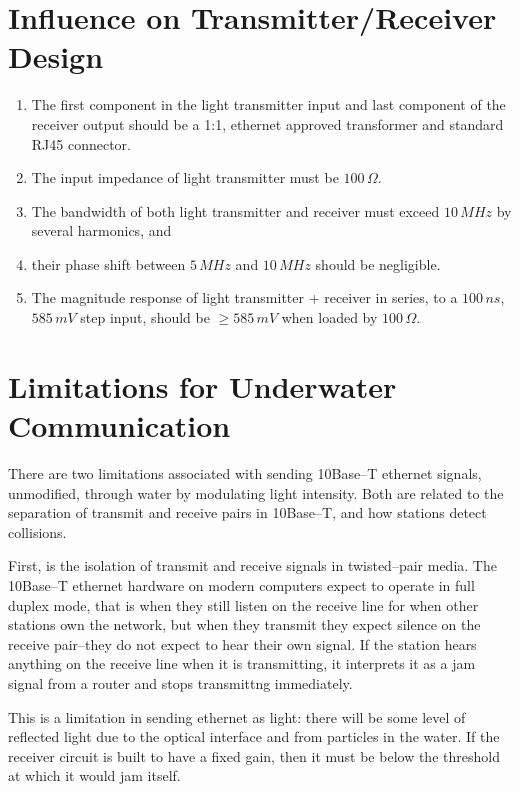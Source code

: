 \documentclass{article}
\begin{document}
\section{Influence on Transmitter/Receiver Design}

\begin{enumerate}
\item The first component in the light transmitter input
and last component of the receiver output should be a 1:1, ethernet approved
transformer and standard RJ45 connector.
\item The input impedance of light transmitter must be $100\,\Omega$.
\item The bandwidth of both light transmitter and receiver must exceed $10\,MHz$
by several harmonics, and
\item their phase shift between $5\,MHz$ and $10\,MHz$ should be negligible.
\item The magnitude response of light transmitter + receiver in series,
to a $100\,ns$, $585\,mV$ step input, should be $\geq585\,mV$ when loaded by $100\,\Omega$.
\end{enumerate}

\section{Limitations for Underwater Communication}

There are two limitations associated with sending 10Base--T ethernet signals,
unmodified, through water by modulating light intensity.
Both are related to the separation of transmit and receive pairs
in 10Base--T, and how stations detect collisions.

First, is the isolation of transmit and receive signals in twisted--pair media.
The 10Base--T ethernet hardware on modern computers expect to operate in full
duplex mode, that is when they still listen on the receive line for when
other stations own the network, but when they transmit they expect silence
on the receive pair--they do not expect to hear their own signal.
If the station hears anything on the receive line when it is transmitting,
it interprets it as a jam signal from a router and stops transmittng immediately.

This is a limitation in sending ethernet as light: there will be some
level of reflected light due to the optical interface and from particles in the water.
If the receiver circuit is built to have a fixed gain, then it must be below
the threshold at which it would jam itself.
\end{document}
